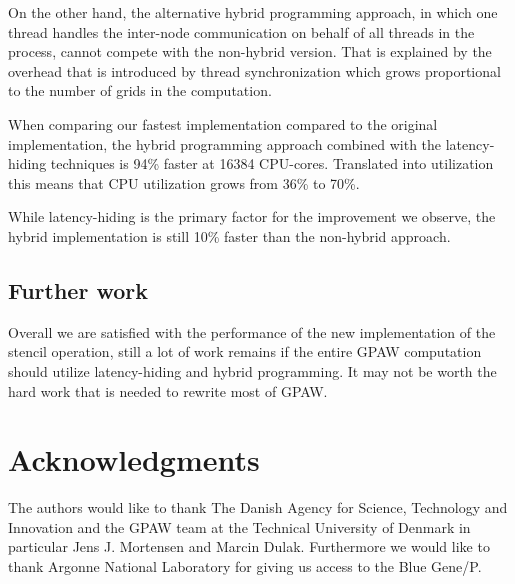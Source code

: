 \documentclass[preprint,3p,times,twocolumn]{elsarticle}
\begin{document}
On the other hand, the alternative hybrid programming approach, in which one thread handles the inter-node communication on behalf of all threads in the process, cannot compete with the non-hybrid version. That is explained by the overhead that is introduced by thread synchronization which grows proportional to the number of grids in the computation.

When comparing our fastest implementation compared to the original implementation, the hybrid programming approach combined with the latency-hiding techniques is 94\% faster at 16384 CPU-cores. Translated into utilization this means that CPU utilization grows from 36\% to 70\%.

While latency-hiding is the primary factor for the improvement we observe, the hybrid implementation is still 10\% faster than the non-hybrid approach.

\subsection{Further work}
Overall we are satisfied with the performance of the new implementation of the stencil operation, still a lot of work remains if the entire GPAW computation should utilize latency-hiding and hybrid programming. It may not be worth the hard work that is needed to rewrite most of GPAW. %

\section{Acknowledgments}
The authors would like to thank The Danish Agency for Science, Technology and Innovation and the GPAW team at the Technical University of Denmark in particular Jens J. Mortensen and Marcin Dulak. Furthermore we would like to thank Argonne National Laboratory for giving us access to the Blue Gene/P.




\end{document}

